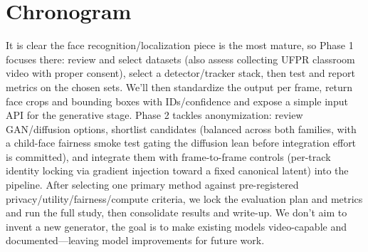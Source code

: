 \documentclass[12pt]{article}
\begin{document}
\section{Chronogram}

It is clear the face recognition/localization piece is the most mature, so Phase 1 focuses there: review and select datasets (also assess collecting UFPR classroom video with proper consent), select a detector/tracker stack, then test and report metrics on the chosen sets. We’ll then standardize the output per frame, return face crops and bounding boxes with IDs/confidence and expose a simple input API for the generative stage. Phase 2 tackles anonymization: review GAN/diffusion options, shortlist candidates (balanced across both families, with a child-face fairness smoke test gating the diffusion lean before integration effort is committed), and integrate them with frame-to-frame controls (per-track identity locking via gradient injection toward a fixed canonical latent) into the pipeline. After selecting one primary method against pre-registered privacy/utility/fairness/compute criteria, we lock the evaluation plan and metrics and run the full study, then consolidate results and write-up. We don’t aim to invent a new generator, the goal is to make existing models video-capable and documented—leaving model improvements for future work.
\end{document}
